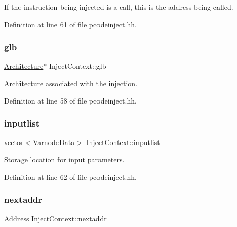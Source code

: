 If the instruction being injected is a call, this is the address being called. 



Definition at line 61 of file pcodeinject.\+hh.

\mbox{\label{class_inject_context_a12f2e51d1fa6e5bc5d5eb88bfc3e0522}} 
\subsubsection{\texorpdfstring{glb}{glb}}
{\footnotesize\ttfamily \mbox{\hyperlink{class_architecture}{Architecture}}$\ast$ Inject\+Context\+::glb}



\mbox{\hyperlink{class_architecture}{Architecture}} associated with the injection. 



Definition at line 58 of file pcodeinject.\+hh.

\mbox{\label{class_inject_context_af71647d43b614664d77f20747f115702}} 
\subsubsection{\texorpdfstring{inputlist}{inputlist}}
{\footnotesize\ttfamily vector$<$\mbox{\hyperlink{struct_varnode_data}{Varnode\+Data}}$>$ Inject\+Context\+::inputlist}



Storage location for input parameters. 



Definition at line 62 of file pcodeinject.\+hh.

\mbox{\label{class_inject_context_a202c30189f3ea69e9fa7b107809a7691}} 
\subsubsection{\texorpdfstring{nextaddr}{nextaddr}}
{\footnotesize\ttfamily \mbox{\hyperlink{class_address}{Address}} Inject\+Context\+::nextaddr}



